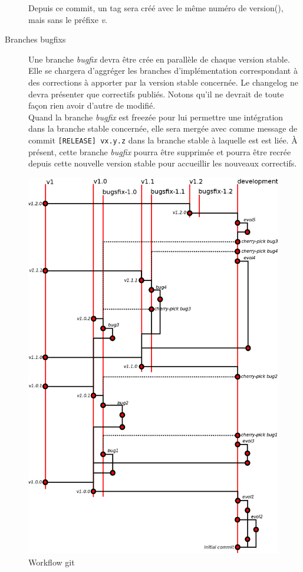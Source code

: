 \begin{description}
		Depuis ce commit, un tag sera créé avec le même numéro de version(), mais sans le préfixe \emph{v}.
	\item[Branches bugfixs]
		Une branche \emph{bugfix} devra être crée en parallèle de chaque version stable.
		Elle se chargera d'aggréger les branches d'implémentation correspondant à des corrections à apporter par la version stable concernée.
		Le changelog ne devra présenter que correctifs publiés.
		Notons qu'il ne devrait de toute façon rien avoir d'autre de modifié.\\

		Quand la branche \emph{bugfix} est freezée pour lui permettre une intégration dans la branche stable concernée, elle sera mergée avec comme message de commit {\tt[RELEASE] vx.y.z} dans la branche stable à laquelle est est liée.
		À présent, cette branche \emph{bugfix} pourra être supprimée et pourra être recrée depuis cette nouvelle version stable pour accueillir les nouveaux correctifs.
\end{description}

\begin{figure}
	\centering
	\includegraphics[scale=0.3]{part/developpement/code/fig_workflow_git.png}
	\caption{Workflow git}
	\label{fig_3.2_git}
\end{figure}
